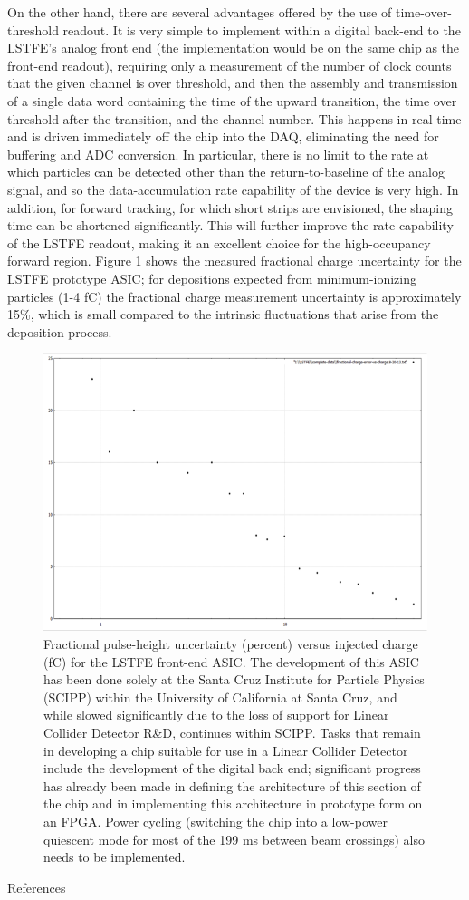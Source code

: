 On the other hand, there are several advantages offered by the use of time-over-threshold readout. It is very simple to implement within a digital back-end to the LSTFE's analog front end (the implementation would be on the same chip as the front-end readout), requiring only a measurement of the number of clock counts that the given channel is over threshold, and then the assembly and transmission of a single data word containing the time of the upward transition, the time over threshold after the transition, and the channel number. This happens in real time and is driven immediately off the chip into the DAQ, eliminating the need for buffering and ADC conversion. In particular, there is no limit to the rate at which particles can be detected other than the return-to-baseline of the analog signal, and so the data-accumulation rate capability of the device is very high. In addition, for forward tracking, for which short strips are envisioned, the shaping time can be shortened significantly. This will further improve the rate capability of the LSTFE readout, making it an excellent choice for the high-occupancy forward region.
Figure 1 shows the measured fractional charge uncertainty for the LSTFE prototype ASIC; for depositions expected from minimum-ionizing particles (1-4 fC) the fractional charge measurement uncertainty is approximately 15\%, which is small compared to the intrinsic fluctuations that arise from the deposition process.
\begin{figure}
\includegraphics{Tracker/SCIPPTracking/SCIPPTracking}
\caption{Fractional pulse-height uncertainty (percent) versus injected charge (fC) for the LSTFE front-end ASIC.
The development of this ASIC has been done solely at the Santa Cruz Institute for Particle Physics (SCIPP) within the University of California at Santa Cruz, and while slowed significantly due to the loss of support for Linear Collider Detector R\&D, continues within SCIPP. Tasks that remain in developing a chip suitable for use in a Linear Collider Detector include the development of the digital back end; significant progress has already been made in defining the architecture of this section of the chip and in implementing this architecture in prototype form on an FPGA. Power cycling (switching the chip into a low-power quiescent mode for most of the 199 ms between beam crossings) also needs to be implemented.}
\end{figure}


References

~\cite{Carman2011118} 


~\cite{Collier2013127} 

